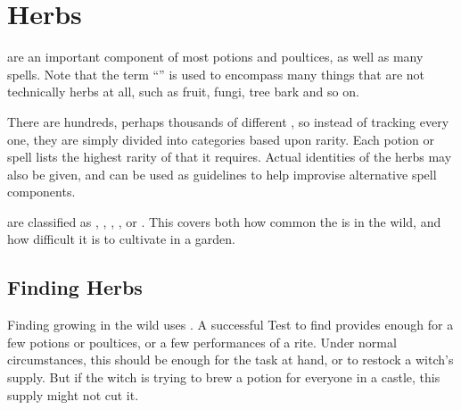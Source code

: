 \section{Herbs}

 are an important component of most potions and poultices, as well as many spells.
Note that the term ``'' is used to encompass many things that are not technically herbs at all, such as fruit, fungi, tree bark and so on.

There are hundreds, perhaps thousands of different , so instead of tracking every one, they are simply divided into categories based upon rarity.
Each potion or spell lists the highest rarity of  that it requires.
Actual identities of the herbs may also be given, and can be used as guidelines to help improvise alternative spell components.

 are classified as , , , , or .
This covers both how common the  is in the wild, and how difficult it is to cultivate in a garden.

\subsection{Finding Herbs}

Finding  growing in the wild uses .
A successful Test to find  provides enough for a few potions or poultices, or a few performances of a rite.
Under normal circumstances, this should be enough for the task at hand, or to restock a witch's supply.
But if the witch is trying to brew a potion for everyone in a castle, this supply might not cut it.


